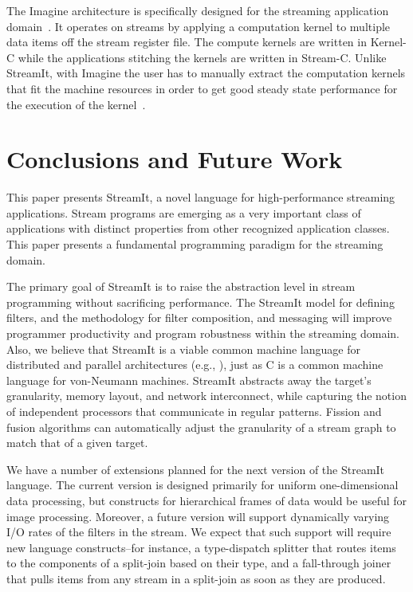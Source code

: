 \documentclass[final]{ijpp}
\begin{document}
The Imagine  architecture is  specifically designed for  the streaming
application domain~\cite{rixner98bandwidthefficient}.   It operates on
streams by  applying a computation  kernel to multiple data  items off
the stream register file.  The compute kernels are written in Kernel-C
while the applications stitching  the kernels are written in Stream-C.
Unlike StreamIt,  with Imagine  the user has  to manually  extract the
computation kernels  that fit  the machine resources  in order  to get
good   steady   state   performance   for   the   execution   of   the
kernel~\cite{kapasi:2001:ss}.


\section{Conclusions and Future Work}
\label{sec:conc}

This paper presents StreamIt, a novel language for high-performance
streaming applications.  Stream programs are emerging as a very
important class of applications with distinct properties from other
recognized application classes.  This paper presents a fundamental
programming paradigm for the streaming domain.

The  primary goal of  StreamIt is  to raise  the abstraction  level in
stream programming without sacrificing performance. The StreamIt model
for defining filters, and  the methodology for filter composition, and
messaging will improve  programmer productivity and program robustness
within  the streaming  domain. Also,  we  believe that  StreamIt is  a
viable   common  machine   language  for   distributed   and  parallel
architectures  (e.g., \cite{smartmemories,rawshort,trips}), just  as C
is  a  common machine  language  for  von-Neumann machines.   StreamIt
abstracts away  the target's  granularity, memory layout,  and network
interconnect,  while capturing  the notion  of  independent processors
that communicate  in regular patterns.  Fission  and fusion algorithms
can automatically  adjust the granularity  of a stream graph  to match
that of a given target.

We have  a number of  extensions planned for  the next version  of the
StreamIt  language.  The  current  version is  designed primarily  for
uniform   one-dimensional   data   processing,  but   constructs   for
hierarchical  frames of  data would  be useful  for  image processing.
Moreover, a future version  will support dynamically varying I/O rates
of  the filters  in  the stream.   We  expect that  such support  will
require  new   language  constructs--for  instance,   a  type-dispatch
splitter that routes items to  the components of a split-join based on
their type, and a fall-through joiner that pulls items from any stream
in a split-join as soon as they are produced.
\end{document}
